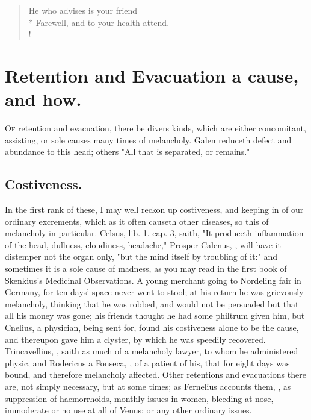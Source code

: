 \begin{verse}%
He who advises is your friend\\*
Farewell, and to your health attend.\\!
\end{verse}%

\section{Retention and Evacuation a cause, and how.}

\lettrine{O}{f} retention and evacuation, there be divers kinds, which are
either concomitant, assisting, or sole causes many times of melancholy.
Galen reduceth defect and abundance to this head; others
"All that is separated, or remains."

\subsection{Costiveness.}

In the first rank of these, I may well reckon up costiveness, and keeping in of
our ordinary excrements, which as it often causeth other diseases, so this of
melancholy in particular. Celsus, lib. 1. cap. 3, saith,
"It produceth inflammation of the head, dullness, cloudiness, headache," \etc{}
Prosper Calenus, , will have it
distemper not the organ only, "but the mind itself by
troubling of it:" and sometimes it is a sole cause of madness, as you may read
in the first book of Skenkius's Medicinal Observations. A
young merchant going to Nordeling fair in Germany, for ten days' space never
went to stool; at his return he was grievously melancholy,
thinking that he was robbed, and would not be persuaded but that all his money
was gone; his friends thought he had some philtrum given him, but Cnelius, a
physician, being sent for, found his costiveness alone to
be the cause, and thereupon gave him a clyster, by which he was speedily
recovered. Trincavellius, , saith as
much of a melancholy lawyer, to whom he administered physic, and Rodericus a
Fonseca, , of a
patient of his, that for eight days was bound, and therefore melancholy
affected. Other retentions and evacuations there are, not simply necessary, but
at some times; as Fernelius accounts them, , as suppression of haemorrhoids, monthly issues in women, bleeding at
nose, immoderate or no use at all of Venus: or any other ordinary issues.

